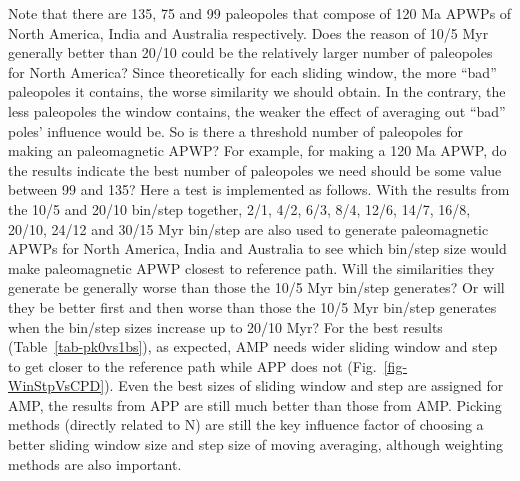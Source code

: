 Note that there are 135, 75 and 99 paleopoles that compose of 120 Ma
APWPs of North America, India and Australia respectively. Does the reason of
10/5 Myr generally better than 20/10 could be the relatively larger number of
paleopoles for North America? Since theoretically for each sliding window, the
more ``bad'' paleopoles it contains, the worse similarity we should obtain. In
the contrary, the less paleopoles the window contains, the weaker the effect of
averaging out ``bad'' poles' influence would be. So is there a threshold number
of paleopoles for making an paleomagnetic APWP\@? For example, for making a
120 Ma APWP, do the results indicate the best number of paleopoles
we need should be some value between 99 and 135? Here a test is implemented as
follows. With the results from the 10/5 and 20/10 bin/step together, 2/1, 4/2,
6/3, 8/4, 12/6, 14/7, 16/8, 20/10, 24/12 and 30/15 Myr bin/step are also used to
generate paleomagnetic APWPs for North America, India and Australia to see which
bin/step size would make paleomagnetic APWP closest to reference path. Will the
similarities they generate be generally worse than those the 10/5 Myr bin/step
generates? Or will they be better first and then worse than those the 10/5 Myr
bin/step generates when the bin/step sizes increase up to 20/10 Myr? For the
best results (Table~\ref{tab-pk0vs1bs}), as expected, AMP needs wider sliding
window and step to get closer to the reference path while APP does not
(Fig.~\ref{fig-WinStpVsCPD}). Even the best sizes of sliding window and step are
assigned for AMP, the results from APP are still much better than those from
AMP\@. Picking methods (directly related to N) are still the key influence
factor of choosing a better sliding window size and step size of moving
averaging, although weighting methods are also important.

